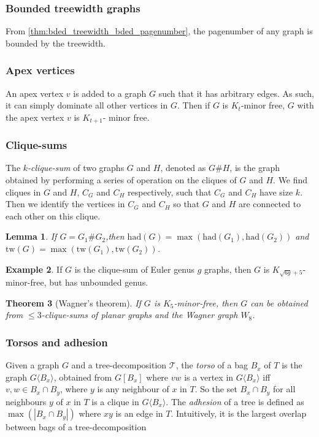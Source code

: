 \documentclass[]{report}
\newcommand{\tree}{\mathcal{T}}
\newcommand{\tw}{\text{tw}}
\newcommand{\had}{\text{had}}
\newtheorem{theorem}{Theorem}
\newtheorem{lemma}[theorem]{Lemma}
\theoremstyle{definition}
\newtheorem{example}[theorem]{Example}
\numberwithin{theorem}{section}
\numberwithin{equation}{section}
\begin{document}
\subsubsection{Bounded treewidth graphs}\label{sssec:Bded_Tw_graph}
From \cref{thm:bded_treewidth_bded_pagenumber}, the pagenumber of any graph is bounded by the treewidth.

\subsubsection{Apex vertices}\label{sssec:Apex_Vertices}
An apex vertex $v$ is added to a graph $G$ such that it has arbitrary edges. As such, it can simply dominate all other vertices in $G$. Then if $G$ is $K_t$-minor free, $G$ with the apex vertex $v$ is $K_{t+1}$- minor free. 
\subsubsection{Clique-sums}\label{sssec:Clique_Sums}
The \textit{$k$-clique-sum} of two graphs $G$ and $H$, denoted as $G \# H$, is the graph obtained by performing a series of operation on the cliques of $G$ and $H$. We find cliques in $G$ and $H$, $C_G$ and $C_H$ respectively, such that $C_G$ and $C_H$ have size $k$. Then we identify the vertices in $C_G$ and $C_H$ so that $G$ and $H$ are connected to each other on this clique. 

\begin{lemma}
	If $G = G_1 \# G_2$,then $\had(G) = \max(\had(G_1), \had(G_2))$ and $\tw(G) = \max(\tw(G_1), \tw(G_2))$.
\end{lemma}

\begin{example}\label{ex:clique_sum_genus}
	If $G$ is the clique-sum of Euler genus $g$ graphs, then $G$ is $K_{\sqrt{6g} + 5}$-minor-free, but has unbounded genus.
\end{example}

\begin{theorem}[Wagner's theorem\cite{wagnerUeberEigenschaftEbenen1937}]\label{thm:WagnersTheorem}
	If $G$ is $K_5$-minor-free, then $G$ can be obtained from $\leq 3$-clique-sums of planar graphs and the Wagner graph $W_8$.
\end{theorem}


\subsubsection{Torsos and adhesion}\label{sssec:Torsos and Adhesion}
Given a graph $G$ and a tree-decomposition $\tree$, the \textit{torso} of a bag $B_x$ of $T$ is the graph $G\langle B_x \rangle$, obtained from $G[B_x]$ where $vw$ is a vertex in $G\langle B_x \rangle$ iff $v,w \in B_x \cap B_y$, where $y$ is any neighbour of $x$ in $T$. So the set $B_x \cap B_y$ for all neighbours $y$ of $x$ in $T$ is a clique in $G\langle B_x \rangle$. 
The \textit{adhesion} of a tree is defined as $\max(|B_x \cap B_y|)$ where $xy$ is an edge in $T$. Intuitively, it is the largest overlap between bags of a tree-decomposition
\end{document}
